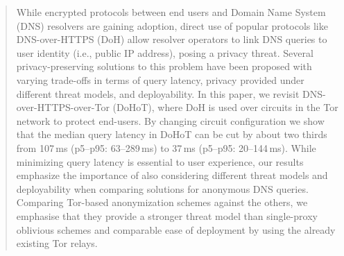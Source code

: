 \begin{abstract}
    While encrypted protocols between end users and Domain Name System (DNS)
    resolvers are gaining adoption, direct use of popular protocols like
    DNS-over-HTTPS (DoH) allow resolver operators to link DNS queries to user
    identity (i.e., public IP address), posing a privacy threat. Several
    privacy-preserving solutions to this problem have been proposed with
    varying trade-offs in terms of query latency, privacy provided under
    different threat models, and deployability. In this paper, we revisit
    DNS-over-HTTPS-over-Tor (DoHoT), where DoH is used over circuits in the Tor
    network to protect end-users. By changing circuit configuration we show
    that the median query latency in DoHoT can be cut by about two thirds from
    107\,ms (p5--p95: 63--289\,ms) to 37\,ms (p5--p95: 20--144\,ms). While
    minimizing query latency is essential to user experience, our results
    emphasize the importance of also considering different threat models and
    deployability when comparing solutions for anonymous DNS queries. Comparing
    Tor-based anonymization schemes against the others, we emphasise that they
    provide a stronger threat model than single-proxy oblivious schemes and
    comparable ease of deployment by using the already existing Tor relays.
\end{abstract}
